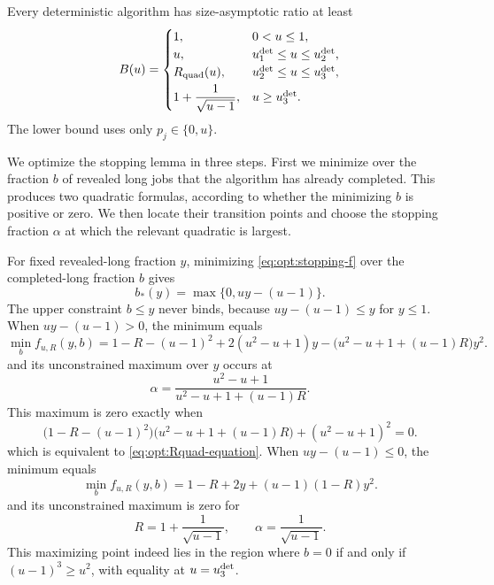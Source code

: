 \begin{proposition}
\label{prop:opt:binary-lower}
Every deterministic algorithm has size-asymptotic ratio at least
\begin{equation}
 B(u)=
 \begin{cases}
  1,&0<u\le1,\\
  u,&u_{1}^{\mathrm{det}}\le u\le u_{2}^{\mathrm{det}},\\
  R_{\mathrm{quad}}(u),&u_{2}^{\mathrm{det}}\le u\le u_{3}^{\mathrm{det}},\\[1mm]
  \displaystyle1+\frac1{\sqrt{u-1}},&u\ge u_{3}^{\mathrm{det}}.
 \end{cases}
 \label{eq:opt:binary-curve}
\end{equation}
The lower bound uses only $p_j\in\{0,u\}$.
\end{proposition}

We optimize the stopping lemma in three steps.  First we minimize over the
fraction $b$ of revealed long jobs that the algorithm has already completed.
This produces two quadratic formulas, according to whether the minimizing
$b$ is positive or zero.  We then locate their transition points and choose
the stopping fraction $\alpha$ at which the relevant quadratic is largest.

\begin{claim}
\label{clm:opt:binary-b-minimization}
For fixed revealed-long fraction $y$, minimizing
\cref{eq:opt:stopping-f} over the completed-long fraction $b$ gives
\begin{equation}
 b_*(y)=\max\{0,uy-(u-1)\}.
 \label{eq:opt:bstar}
\end{equation}
The upper constraint $b\le y$ never binds, because
$uy-(u-1)\le y$ for $y\le1$.
When $uy-(u-1)>0$, the minimum equals
\begin{equation}
 \min_b f_{u,R}(y,b)
 =1-R-(u-1)^2+2(u^2-u+1)y
  -\bigl(u^2-u+1+(u-1)R\bigr)y^2.
 \label{eq:opt:stopping-positive-branch}
\end{equation}
and its unconstrained maximum over $y$ occurs at
\[
 \alpha=\frac{u^2-u+1}{u^2-u+1+(u-1)R}.
\]
This maximum is zero exactly when
\begin{equation}
 \bigl(1-R-(u-1)^2\bigr)
 \bigl(u^2-u+1+(u-1)R\bigr)+(u^2-u+1)^2=0.
 \label{eq:opt:stopping-tangency}
\end{equation}
which is equivalent to \cref{eq:opt:Rquad-equation}.  When
$uy-(u-1)\le0$, the minimum equals
\begin{equation}
 \min_b f_{u,R}(y,b)
 =1-R+2y+(u-1)(1-R)y^2.
\end{equation}
and its unconstrained maximum is zero for
\begin{equation}
 R=1+\frac1{\sqrt{u-1}},
 \qquad
 \alpha=\frac1{\sqrt{u-1}}.
 \label{eq:opt:zero-b-tangency}
\end{equation}
This maximizing point indeed lies in the region where $b=0$ if and only if
$(u-1)^3\ge u^2$, with equality at $u=u_{3}^{\mathrm{det}}$.
\end{claim}

